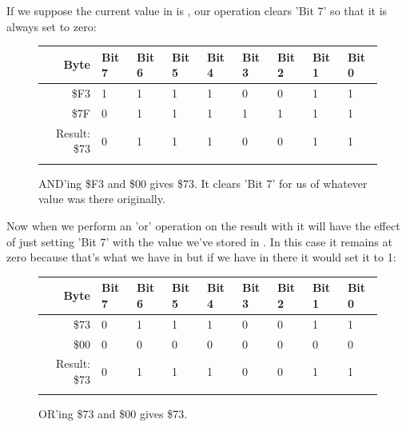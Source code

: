 If we suppose the current value in  is , our  operation clears 'Bit 7' so that
it is always set to zero:

\begin{figure}[H]
  {
    \setlength{\tabcolsep}{3.0pt}
    \setlength\cmidrulewidth{\heavyrulewidth} %
    \begin{adjustbox}{width=10cm,center}

      \begin{tabular}{rllllllll}
        \toprule
        Byte & Bit 7 & Bit 6 & Bit 5 & Bit 4 & Bit 3 & Bit 2 & Bit 1 & Bit 0        \\
        \midrule
        \$F3 & 1 & 1 & 1 & 1 & 0 & 0 & 1 & 1 \\
        \$7F & 0 & 1 & 1 & 1 & 1 & 1 & 1 & 1 \\
        \midrule
        Result: \$73 & 0 & 1 & 1 & 1 & 0 & 0 & 1 & 1 \\
        \addlinespace
        \bottomrule
      \end{tabular}
    \end{adjustbox}
  }\caption*{AND'ing \$F3 and \$00 gives \$73. It clears 'Bit 7' for us of whatever value was there originally.}
\end{figure}

Now when we perform an 'or' operation on the result with  it will have the effect of just setting 'Bit 7'
with the value we've stored in . In this case it remains at zero because that's what we have in
 but if we have  in there it would set it to 1: 

\begin{figure}[H]
  {
    \setlength{\tabcolsep}{3.0pt}
    \setlength\cmidrulewidth{\heavyrulewidth} %
    \begin{adjustbox}{width=10cm,center}

      \begin{tabular}{rllllllll}
        \toprule
        Byte & Bit 7 & Bit 6 & Bit 5 & Bit 4 & Bit 3 & Bit 2 & Bit 1 & Bit 0        \\
        \midrule
        \$73 & 0 & 1 & 1 & 1 & 0 & 0 & 1 & 1 \\
        \$00 & 0 & 0 & 0 & 0 & 0 & 0 & 0 & 0 \\
        \midrule
        Result: \$73 & 0 & 1 & 1 & 1 & 0 & 0 & 1 & 1 \\
        \addlinespace
        \bottomrule
      \end{tabular}
    \end{adjustbox}
  }\caption*{OR'ing \$73 and \$00 gives \$73.}
\end{figure}


